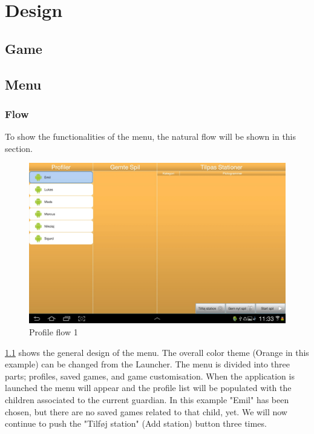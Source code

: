\chapter{Design}


\section{Game}


\section{Menu}

\subsection{Flow}
To show the functionalities of the menu, the natural flow will be shown in this section.
\begin{figure}[H]
\centering
\includegraphics[width=0.9\linewidth]{img/screenshots/profile_flow_1.jpg}%
\caption{Profile flow 1}
\label{fig:profile_flow_1}
\end{figure}
\ref{fig:profile_flow_1} shows the general design of the menu. The overall color theme (Orange in this example) can be changed from the Launcher. The menu is divided into three parts; profiles, saved games, and game customisation. When the application is launched the menu will appear and the profile list will be populated with the children associated to the current guardian. In this example "Emil" has been chosen, but there are no saved games related to that child, yet.
We will now continue to push the "Tilføj station" (Add station) button three times.

